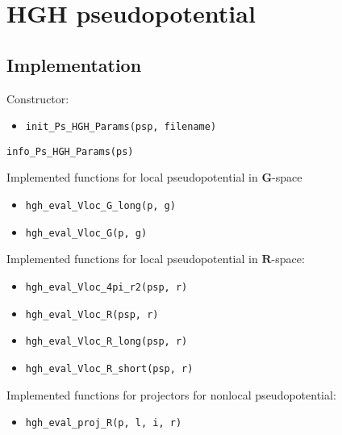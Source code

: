 \chapter{HGH pseudopotential}

\section{Implementation}

Constructor:
\begin{itemize}
\item \texttt{init\_Ps\_HGH\_Params(psp, filename)}
\end{itemize}

\texttt{info\_Ps\_HGH\_Params(ps)}


Implemented functions for local pseudopotential in $\mathbf{G}$-space
\begin{itemize}
\item \texttt{hgh\_eval\_Vloc\_G\_long(p, g)}
\item \texttt{hgh\_eval\_Vloc\_G(p, g)}
\end{itemize}

Implemented functions for local pseudopotential in $\mathbf{R}$-space:
\begin{itemize}
\item \texttt{hgh\_eval\_Vloc\_4pi\_r2(psp, r)}
\item \texttt{hgh\_eval\_Vloc\_R(psp, r)}
\item \texttt{hgh\_eval\_Vloc\_R\_long(psp, r)}
\item \texttt{hgh\_eval\_Vloc\_R\_short(psp, r)}
\end{itemize}

Implemented functions for projectors for nonlocal pseudopotential:
\begin{itemize}
\item \texttt{hgh\_eval\_proj\_R(p, l, i, r)}
\end{itemize}
